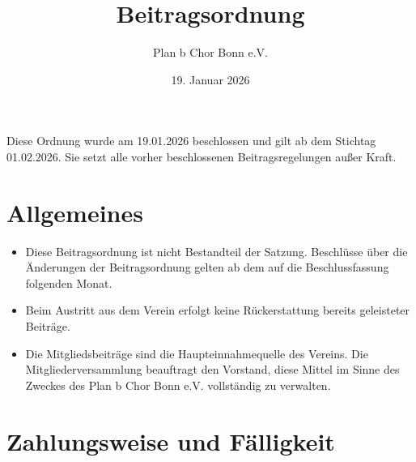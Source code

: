 \documentclass[12pt,paper=a4,ngerman]{report}
\title{\textbf{Beitragsordnung}}
\author{Plan b Chor Bonn e.V.}
\date{19. Januar 2026}
\begin{document}
\maketitle

\section{}

Diese Ordnung wurde am 19.01.2026 beschlossen und gilt ab dem Stichtag 01.02.2026. Sie
setzt alle vorher beschlossenen Beitragsregelungen außer Kraft.

\section{Allgemeines}

\begin{itemize}
    \item Diese Beitragsordnung ist nicht Bestandteil der Satzung. Beschlüsse über die Änderungen der Beitragsordnung gelten ab dem auf die Beschlussfassung folgenden Monat.
    \item Beim Austritt aus dem Verein erfolgt keine Rückerstattung bereits geleisteter Beiträge.
    \item Die Mitgliedsbeiträge sind die Haupteinnahmequelle des Vereins. Die Mitgliederversammlung beauftragt den Vorstand, diese Mittel im Sinne des Zweckes des Plan b Chor Bonn e.V. vollständig zu verwalten.
\end{itemize}

\section{Zahlungsweise und Fälligkeit}
\end{document}
